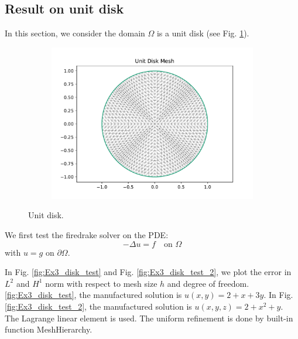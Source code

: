\documentclass[12pt]{article}%
\theoremstyle{plain}
\numberwithin{equation}{section}
\begin{document}
\subsection{Result on unit disk} 
In this section, we consider the domain $\Omega$ is a unit disk (see Fig. \ref{fig:unit_disk}).
  \begin{figure}[H]%
    \centering
         \begin{subfigure}[h]{0.45\linewidth}
  \includegraphics[width=\linewidth]{figures/Ex3/unit_disk.pdf}
\end{subfigure}
  \caption{Unit disk.}
  \label{fig:unit_disk}
 \end{figure}

We first test the firedrake solver on the PDE:
\begin{equation}
-\Delta u =f \quad\text{on }\Omega
\end{equation}
with $u=g$ on $\partial \Omega$. 

In Fig. \ref{fig:Ex3_disk_test} and Fig.  \ref{fig:Ex3_disk_test_2}, we plot the error in $L^2$ and $H^1$ norm with respect to mesh size $h$ and degree of freedom. \ref{fig:Ex3_disk_test}, the manufactured solution is $u(x,y)= 2+x+3y$. In Fig. \ref{fig:Ex3_disk_test_2}, the manufactured solution is $u(x,y,z)= 2+x^2+y$. The Lagrange linear element is used. The uniform refinement is done by built-in function MeshHierarchy.
\end{document}
